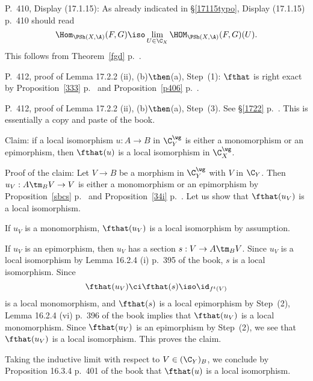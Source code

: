 \documentclass[12pt]{article}
\theoremstyle{remark}
\theoremstyle{definition}
\begin{document}
%

\begin{s}
P.~410, Display (17.1.15): As already indicated in \S\ref{17115typo}, Display (17.1.15) p.~410 should read 
$$
\Hom_{\PSh(X,\A)}(F,G)\iso\lim_{U\in\C_X}\HOM_{\PSh(X,\A)}(F,G)(U).
$$
This follows from Theorem~\ref{fgd} p.~. %
\end{s} 

%



%

\begin{s}
P.~412, proof of Lemma 17.2.2 (ii), (b)$\then$(a), Step~(1): $\fthat$ is right exact by Proposition~\ref{333} p.~ and Proposition~\ref{p406} p.~.
\end{s}

%

\begin{s}
P.~412, proof of Lemma 17.2.2 (ii), (b)$\then$(a), Step~(3). See \S\ref{1722} p.~. This is essentially a copy and paste of the book.

Claim: if a local isomorphism $u:A\to B$ in $\C_Y^\wg$ is either a monomorphism or an epimorphism, then $\fthat(u)$ is a local isomorphism in $\C_X^\wg$. 

Proof of the claim: Let $V\to B$ be a morphism in $\C_Y^\wg$ with $V$ in $\C_Y$. Then $u_V: A\tm_BV\to V$ is either a monomorphism or an epimorphism by Proposition~\ref{sbcs} p.~ and Proposition~\ref{34i} p.~. Let us show that $\fthat(u_V)$ is a local isomorphism. 

If $u_V$ is a monomorphism, $\fthat(u_V)$ is a local isomorphism by assumption. 

If $u_V$ is an epimorphism, then $u_V$ has a section $s:V\to A\tm_BV$. Since $u_V$ is a local isomorphism by Lemma 16.2.4 (i) p.~395 of the book, $s$ is a local isomorphism. Since 
$$
\fthat(u_V)\ci\fthat(s)\iso\id_{f^t(V)}
$$ 
is a local monomorphism, and $\fthat(s)$ is a local epimorphism by Step~(2), Lemma 16.2.4 (vi) p.~396 of the book implies that $\fthat(u_V)$ is a local monomorphism. Since $\fthat(u_V)$ is an epimorphism by Step~(2), we see that $\fthat(u_V)$ is a local isomorphism. This proves the claim.

Taking the inductive limit with respect to $V\in(\C_Y)_B$, we conclude by Proposition 16.3.4 p.~401 of the book that $\fthat(u)$ is a local isomorphism.
\end{s}
\end{document}
